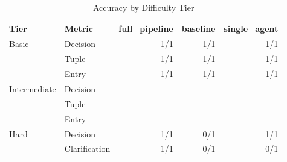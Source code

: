 \begin{table}[htbp]
\centering
\caption{Accuracy by Difficulty Tier}
\label{tab:tier-breakdown}
\begin{tabular}{ll rrr}
\toprule
Tier & Metric & full\_pipeline & baseline & single\_agent \\
\midrule
  Basic & Decision & 1/1 & 1/1 & 1/1 \\
   & Tuple & 1/1 & 1/1 & 1/1 \\
   & Entry & 1/1 & 1/1 & 1/1 \\
  \midrule
  Intermediate & Decision & --- & --- & --- \\
   & Tuple & --- & --- & --- \\
   & Entry & --- & --- & --- \\
  \midrule
  Hard & Decision & 1/1 & 0/1 & 1/1 \\
   & Clarification & 1/1 & 0/1 & 0/1 \\
\bottomrule
\end{tabular}
\end{table}
